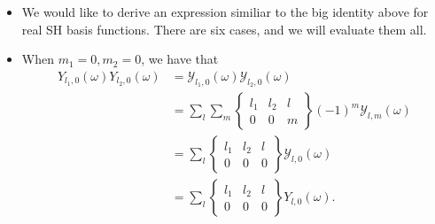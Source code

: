 \documentclass[10pt]{article}
\begin{document}
\begin{itemize}
		\item We would like to derive an expression similiar to the big identity above for real SH basis functions.  There are six cases, and we will evaluate them all.

		\item When $m_1 = 0, m_2 = 0$, we have that
		\begin{align*}
			Y_{l_1, 0}(\omega) Y_{l_2, 0}(\omega)
			&= \mathcal{Y}_{l_1, 0}(\omega) \mathcal{Y}_{l_2, 0}(\omega) \\
			&= \sum_{l} \sum_{m} \begin{Bmatrix}
				l_1 & l_2 & l \\
				0 & 0 & m
			\end{Bmatrix} 
			(-1)^m \mathcal{Y}_{l,m}(\omega)\\
			&= \sum_{l} \begin{Bmatrix}
				l_1 & l_2 & l \\
				0 & 0 & 0
			\end{Bmatrix}
			\mathcal{Y}_{l,0}(\omega)\\
			&= \sum_{l} \begin{Bmatrix}
				l_1 & l_2 & l \\
				0 & 0 & 0
			\end{Bmatrix} 
			Y_{l,0}(\omega).
		\end{align*}


\end{itemize}
\end{document}
